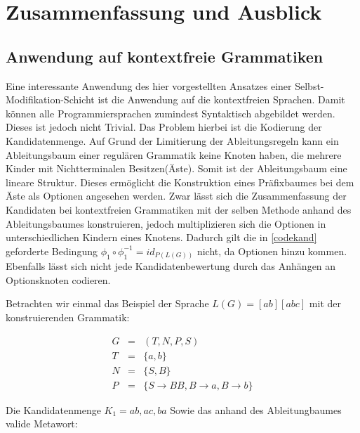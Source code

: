 \documentclass[a4paper,12pt]{report}
\begin{document}

\chapter{Zusammenfassung und Ausblick}
\label{ausblick}


\section{Anwendung auf kontextfreie Grammatiken}

Eine interessante Anwendung des hier vorgestellten Ansatzes einer Selbst-Modifikation-Schicht ist die Anwendung auf die kontextfreien Sprachen. Damit können alle Programmiersprachen zumindest Syntaktisch abgebildet werden. Dieses ist jedoch nicht Trivial. Das Problem hierbei ist die Kodierung der Kandidatenmenge. Auf Grund der Limitierung der Ableitungsregeln kann ein Ableitungsbaum einer regulären Grammatik keine Knoten haben, die mehrere Kinder mit Nichtterminalen Besitzen(Äste). Somit ist der Ableitungsbaum eine lineare Struktur. Dieses ermöglicht die Konstruktion eines Präfixbaumes bei dem Äste als Optionen angesehen werden. 
Zwar lässt sich die Zusammenfassung der Kandidaten bei kontextfreien Grammatiken mit der selben Methode anhand des Ableitungsbaumes konstruieren, jedoch multiplizieren sich die Optionen in unterschiedlichen Kindern eines Knotens. Dadurch gilt die in \ref{codekand} geforderte Bedingung $\phi_1\circ\phi_1^{-1} = id_{P(L(G))}$ nicht, da Optionen hinzu kommen. Ebenfalls lässt sich nicht jede Kandidatenbewertung durch das Anhängen an Optionsknoten codieren.

Betrachten wir einmal das Beispiel der Sprache $L(G) = { [ab][abc] }$ mit der konstruierenden Grammatik: 

\begin{eqnarray}
  G &=& (T,N,P,S)\\
  T &=& \{ a, b \}\\
  N &=& \{ S, B \} \\
  P &=& \{ S\rightarrow BB, B\rightarrow a, B\rightarrow b\}
\end{eqnarray}

Die Kandidatenmenge $K_1={ab, ac, ba}$
Sowie das anhand des Ableitungbaumes valide Metawort: 
\end{document}
